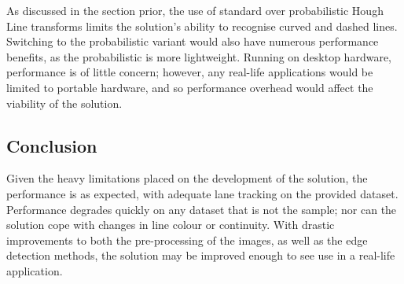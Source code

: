 \documentclass[conference]{IEEEtran}
\begin{document}
As discussed in the section prior, the use of standard over probabilistic Hough Line transforms limits the solution's ability to recognise curved and dashed lines. Switching to the probabilistic variant would also have numerous performance benefits, as the probabilistic is more lightweight. Running on desktop hardware, performance is of little concern; however, any real-life applications would be limited to portable hardware, and so performance overhead would affect the viability of the solution.

\subsection{Conclusion}
Given the heavy limitations placed on the development of the solution, the performance is as expected, with adequate lane tracking on the provided dataset. Performance degrades quickly on any dataset that is not the sample; nor can the solution cope with changes in line colour or continuity. With drastic improvements to both the pre-processing of the images, as well as the edge detection methods, the solution may be improved enough to see use in a real-life application.


%
%

\end{document}
